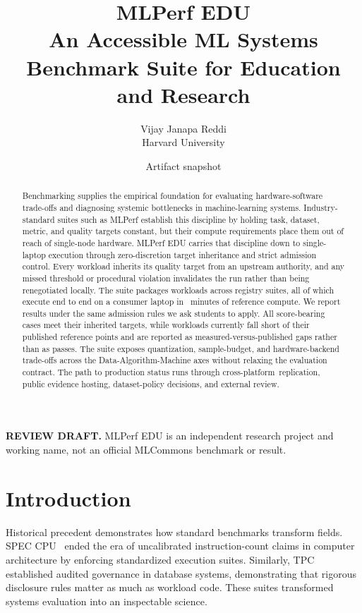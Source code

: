 \documentclass[10pt,twocolumn]{article}
\title{\Huge\bfseries MLPerf EDU\\[0.4em]\Large\normalfont An Accessible ML Systems Benchmark Suite for Education and Research}
\author{
  \fontsize{12}{15}\selectfont
  Vijay Janapa Reddi\\[0.2em]
  \fontsize{11}{14}\selectfont
  Harvard University
}
\date{Artifact snapshot \PaperSnapshotDate}
\begin{document}
\thispagestyle{plain}
\maketitle
\begin{center}
\vspace{-1.2em}
\footnotesize\textbf{REVIEW DRAFT.} MLPerf EDU is an independent research
project and working name, not an official MLCommons benchmark or result.
\end{center}

\begin{abstract}
Benchmarking supplies the empirical foundation for evaluating hardware-software trade-offs and diagnosing systemic bottlenecks in machine-learning systems. Industry-standard suites such as MLPerf establish this discipline by holding task, dataset, metric, and quality targets constant, but their compute requirements place them out of reach of single-node hardware. MLPerf EDU carries that discipline down to single-laptop execution through zero-discretion target inheritance and strict admission control. Every workload inherits its quality target from an upstream authority, and any missed threshold or procedural violation invalidates the run rather than being renegotiated locally. The suite packages \RegistryRows{} workloads across \RegistrySuites{} registry suites, all of which execute end to end on a consumer laptop in \ScoreReferenceTotalMinutes{}~minutes of reference compute. We report results under the same admission rules we ask students to apply. All \ScoreBearingPassing{} score-bearing cases meet their inherited targets, while \FunctionalSetupWorkloads{} workloads currently fall short of their published reference points and are reported as measured-versus-published gaps rather than as passes. The suite exposes quantization, sample-budget, and hardware-backend trade-offs across the Data-Algorithm-Machine axes without relaxing the evaluation contract. The path to production status runs through \mbox{cross-platform replication}, public evidence hosting, dataset-policy decisions, and external review.
\end{abstract}

\section{Introduction}
\label{sec:intro}

Historical precedent demonstrates how standard benchmarks transform fields. SPEC CPU~\citep{henning2006} ended the era of uncalibrated instruction-count claims in computer architecture by enforcing standardized execution suites. Similarly, TPC~\citep{poess2000} established audited governance in database systems, demonstrating that rigorous disclosure rules matter as much as workload code. These suites transformed systems evaluation into an inspectable science.
\end{document}
